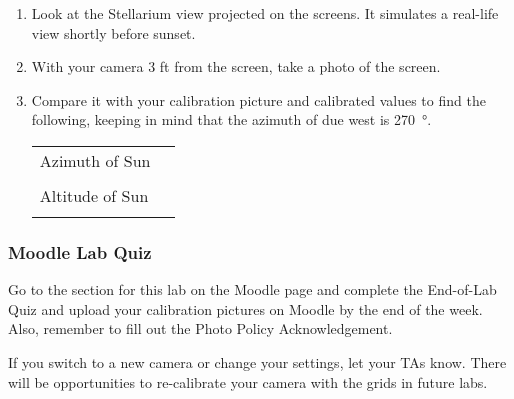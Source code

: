 \documentclass[main.tex]{subfiles}
\begin{document}
\begin{enumerate}
\item Look at the Stellarium view projected on the screens. It simulates a real-life view shortly before sunset.
\item With your camera 3 ft from the screen, take a photo of the screen.
\item Compare it with your calibration picture and calibrated values to find the following, keeping in mind that the azimuth of due west is \SI{270}{\degree}.
\begin{center}
\begin{tabular}{|p{3cm}|p{4cm}|}\hline
Azimuth of Sun & \\
&\\\hline
Altitude of Sun & \\
&\\\hline
\end{tabular}
\end{center}
\end{enumerate}

\subsubsection{Moodle Lab Quiz}
Go to the section for this lab on the Moodle page and complete the End-of-Lab Quiz and upload your calibration pictures on Moodle by the end of the week. Also, remember to fill out the Photo Policy Acknowledgement.

If you switch to a new camera or change your settings, let your TAs know. There will be opportunities to re-calibrate your camera with the grids in future labs.
\end{document}
